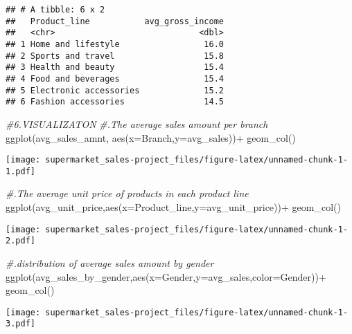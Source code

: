 \documentclass[
]{article}
\newenvironment{Shaded}{\begin{snugshade}}{\end{snugshade}}
\newcommand{\AttributeTok}[1]{\textcolor[rgb]{0.77,0.63,0.00}{#1}}
\newcommand{\CommentTok}[1]{\textcolor[rgb]{0.56,0.35,0.01}{\textit{#1}}}
\newcommand{\FunctionTok}[1]{\textcolor[rgb]{0.00,0.00,0.00}{#1}}
\newcommand{\NormalTok}[1]{#1}
\newcommand{\SpecialCharTok}[1]{\textcolor[rgb]{0.00,0.00,0.00}{#1}}
\begin{document}
\begin{verbatim}
## # A tibble: 6 x 2
##   Product_line           avg_gross_income
##   <chr>                             <dbl>
## 1 Home and lifestyle                 16.0
## 2 Sports and travel                  15.8
## 3 Health and beauty                  15.4
## 4 Food and beverages                 15.4
## 5 Electronic accessories             15.2
## 6 Fashion accessories                14.5
\end{verbatim}

\begin{Shaded}
\begin{Highlighting}[]
\CommentTok{\#6.VISUALIZATON}
\CommentTok{\#.The average sales amount per branch}
\FunctionTok{ggplot}\NormalTok{(avg\_sales\_amnt, }\FunctionTok{aes}\NormalTok{(}\AttributeTok{x=}\NormalTok{Branch,}\AttributeTok{y=}\NormalTok{avg\_sales))}\SpecialCharTok{+}
         \FunctionTok{geom\_col}\NormalTok{()}
\end{Highlighting}
\end{Shaded}

\texttt{[image: supermarket\_sales-project\_files/figure-latex/unnamed-chunk-1-1.pdf]}

\begin{Shaded}
\begin{Highlighting}[]
\CommentTok{\#.The average unit price of products in each product line}
\FunctionTok{ggplot}\NormalTok{(avg\_unit\_price,}\FunctionTok{aes}\NormalTok{(}\AttributeTok{x=}\NormalTok{Product\_line,}\AttributeTok{y=}\NormalTok{avg\_unit\_price))}\SpecialCharTok{+}
  \FunctionTok{geom\_col}\NormalTok{()}
\end{Highlighting}
\end{Shaded}

\texttt{[image: supermarket\_sales-project\_files/figure-latex/unnamed-chunk-1-2.pdf]}

\begin{Shaded}
\begin{Highlighting}[]
\CommentTok{\#.distribution of average sales amount by gender}
\FunctionTok{ggplot}\NormalTok{(avg\_sales\_by\_gender,}\FunctionTok{aes}\NormalTok{(}\AttributeTok{x=}\NormalTok{Gender,}\AttributeTok{y=}\NormalTok{avg\_sales,}\AttributeTok{color=}\NormalTok{Gender))}\SpecialCharTok{+}
  \FunctionTok{geom\_col}\NormalTok{()}
\end{Highlighting}
\end{Shaded}

\texttt{[image: supermarket\_sales-project\_files/figure-latex/unnamed-chunk-1-3.pdf]}
\end{document}
